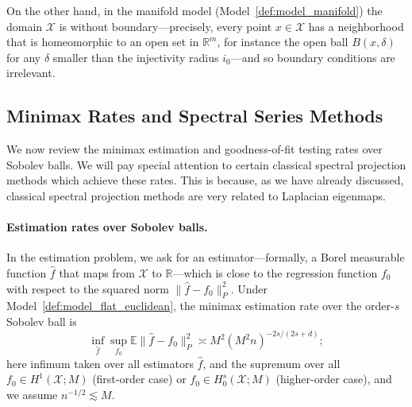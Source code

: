 \documentclass{article}
\newcommand{\Reals}{\mathbb{R}}
\newcommand{\1}{\mathbf{1}}
\newcommand{\mc}[1]{\mathcal{#1}}
\newcommand{\Ebb}{\mathbb{E}}
\newcommand{\wh}[1]{\widehat{#1}}
\theoremstyle{alden}
\theoremstyle{aldenthm}
\theoremstyle{definition}
\theoremstyle{remark}
\begin{document}
On the other hand, in the manifold model (Model~\ref{def:model_manifold}) the domain $\mc{X}$ is without boundary---precisely, every point $x \in \mc{X}$ has a neighborhood that is homeomorphic to an open set in $\Reals^m$, for instance the open ball $B(x,\delta)$ for any $\delta$ smaller than the injectivity radius $i_0$---and so boundary conditions are irrelevant. 

\subsection{Minimax Rates and Spectral Series Methods}
\label{subsec:minimax_rates_sobolev}
We now review the minimax estimation and goodness-of-fit testing rates over Sobolev balls. We will pay special attention to certain classical spectral projection methods which achieve these rates. This is because, as we have already discussed, classical spectral projection methods are very related to Laplacian eigenmaps.

\paragraph{Estimation rates over Sobolev balls.}
In the estimation problem, we ask for an estimator---formally, a Borel measurable function $\wh{f}$ that maps from $\mc{X}$ to $\Reals$---which is close to the regression function $f_0$ with respect to the squared norm $\|\wh{f} - f_0\|_{P}^2$. Under Model~\ref{def:model_flat_euclidean}, the minimax estimation rate over the order-$s$ Sobolev ball is
\begin{equation}
\label{eqn:sobolev_space_minimax_estimation_rate}
\inf_{\wh{f}} \sup_{f_0} \Ebb\|\wh{f} - f_0\|_P^2 \asymp M^2(M^2n)^{-2s/(2s + d)};
\end{equation}
here infimum taken over all estimators $\wh{f}$, and the supremum over all $f_0 \in H^1(\mc{X};M)$ (first-order case) or $f_0 \in H_0^s(\mc{X};M)$ (higher-order case), and we assume $n^{-1/2} \lesssim M$.
\end{document}
